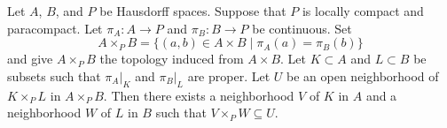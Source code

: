 Let $A$, $B$, and $P$ be Hausdorff spaces. Suppose that $P$ is locally compact and paracompact. Let $\pi_A: A \to P$ and $\pi_B: B \to P$ be continuous. Set
$$A \times_P B = \{(a, b) \in A \times B \mid \pi_A(a) = \pi_B(b)\}$$
and give $A \times_P B$ the topology induced from $A \times B$. Let $K \subset A$ and $L \subset B$ be subsets such that $\pi_A|_K$ and $\pi_B|_L$ are proper. Let $U$ be an open neighborhood of $K \times_P L$ in $A \times_P B$. Then there exists a neighborhood $V$ of $K$ in $A$ and a neighborhood $W$ of $L$ in $B$ such that $V \times_P W \subseteq U$.
